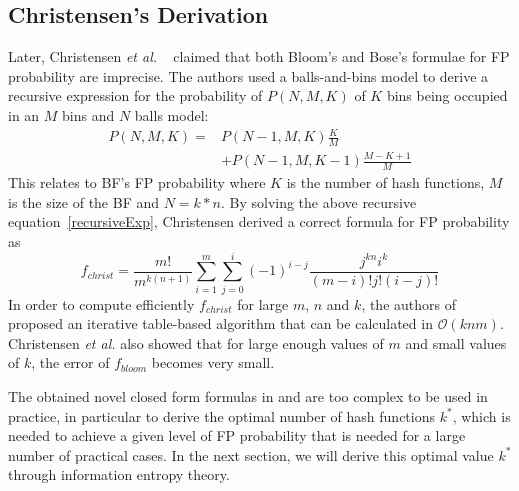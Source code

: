 \subsection{Christensen's Derivation}
Later, Christensen \textit{et al.} ~\cite{ken2010false} claimed that both Bloom's and Bose's formulae for FP probability are imprecise. The authors used a balls-and-bins model to derive a recursive expression for the probability of $P(N,M,K)$ of $K$ bins being occupied in an $M$ bins and $N$ balls model:
\begin{equation}
\label{recursiveExp}
\begin{aligned}
P(N,M,K) = & P(N-1,M,K)\frac{K}{M} \\
& +P(N-1,M,K-1)\frac{M-K+1}{M}
\end{aligned}
\end{equation}
This relates to BF's FP probability where $K$ is the number of hash functions, $M$ is the size of the BF and $N=k*n$. %
By solving the above recursive equation~\ref{recursiveExp}, Christensen derived a correct formula for FP probability as
\begin{equation}
\label{fChristen}
f_{christ}=\dfrac{m!}{m^{k(n+1)}}\sum\limits_{i=1}^{m} \sum\limits_{j=0}^{i} (-1)^{i-j}  \dfrac{j^{kn}i^k}{(m-i)!j!(i-j)!}
\end{equation}
In order to compute efficiently $f_{christ}$ for large $m$, $n$ and $k$, the authors of ~\cite{ken2010false} proposed an iterative table-based algorithm that can be calculated in $\mathcal{O}(knm)$. Christensen \textit{et al.} also showed that for large enough values of $m$ and small values of $k$, the error of $f_{bloom}$ becomes very small. 

The obtained novel closed form formulas in \cite{bose2008false} and \cite{ken2010false} are too complex to be used in practice, in particular to derive the optimal number of hash functions $k^*$, 
which is needed to achieve a given level of FP probability that is needed for a large number of practical cases. 
In the next section, we will derive this optimal value $k^*$ through information entropy theory. 

